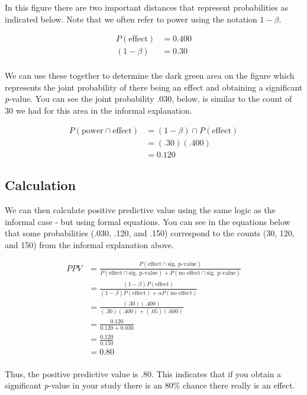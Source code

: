 \documentclass[
]{krantz}
\begin{document}
In this figure there are two important distances that represent probabilities as indicated below. Note that we often refer to power using the notation \(1 - \beta\).

\[
\begin{aligned}
P(\text{effect}) &= 0.400 \\
(1 - \beta) &= 0.30 \\
\end{aligned}
\]

We can use these together to determine the dark green area on the figure which represents the joint probability of there being an effect and obtaining a significant \emph{p}-value. You can see the joint probability .030, below, is similar to the count of 30 we had for this area in the informal explanation.

\[
\begin{aligned}
P(\text{power}  \cap \text{effect}) &= (1 - \beta) \cap P(\text{effect})\\
&= (.30)(.400) \\
&= 0.120
\end{aligned}
\]

\hypertarget{calculation}{%
\subsection{Calculation}\label{calculation}}

We can then calculate positive predictive value using the same logic as the informal case - but using formal equations. You can see in the equations below that some probabilities (.030, .120, and .150) correspond to the counts (30, 120, and 150) from the informal explanation above.

\[
\begin{aligned}
PPV &= \frac{P(\text{effect} \cap \text{sig. p-value})}{P(\text{effect} \cap \text{sig. p-value}) + P(\text{no effect} \cap \text{sig. p-value})} \\
&= \frac{(1 - \beta)P(\text{effect})}{(1 - \beta)P(\text{effect}) + \alpha P(\text{no effect})}\\
&= \frac{(.30)(.400)}{(.30)(.400) + (.05)(.600)}\\
&= \frac{0.120}{0.120 + 0.030}\\
&= \frac{0.120}{0.150}\\
&= 0.80\\
\end{aligned}
\]

Thus, the positive predictive value is .80. This indicates that if you obtain a significant \emph{p}-value in your study there is an 80\% chance there really is an effect.
\end{document}
